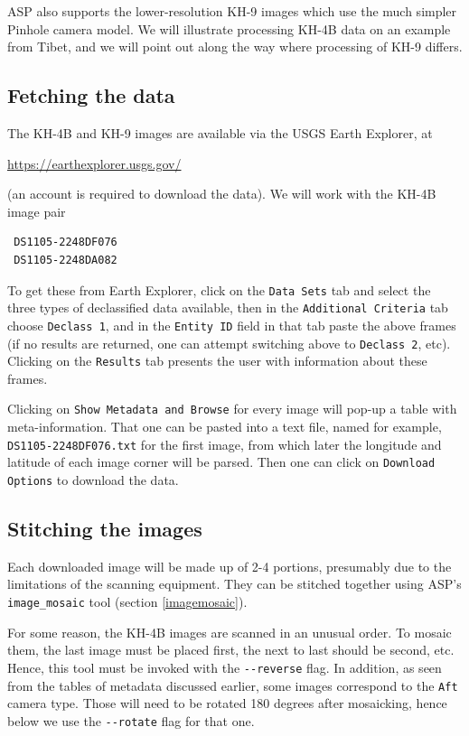 ASP also supports the lower-resolution KH-9 images which use the much
simpler Pinhole camera model. We will illustrate processing KH-4B data
on an example from Tibet, and we will point out along the way where
processing of KH-9 differs.

\subsection{Fetching the data}

The KH-4B and KH-9 images are available via the USGS Earth Explorer, at
\begin{center}
 \url{https://earthexplorer.usgs.gov/}
\end{center}

(an account is required to download the data). We will work with the
KH-4B image pair

\begin{verbatim}
 DS1105-2248DF076
 DS1105-2248DA082
\end{verbatim}

To get these from Earth Explorer, click on the \texttt{Data Sets}
tab and select the three types of declassified data available, then in the 
\texttt{Additional Criteria} tab choose \texttt{Declass 1}, and in
the \texttt{Entity ID} field in that tab paste the above frames (if no results
are returned, one can attempt switching above to \texttt{Declass 2},
etc). Clicking on the \texttt{Results} tab presents the user with information about
these frames.

Clicking on \texttt{Show Metadata and Browse} for every
image will pop-up a table with meta-information. That one can be pasted
into a text file, named for example, \texttt{DS1105-2248DF076.txt} for the
first image, from which later the longitude and latitude of each image corner
will be parsed. Then one can click on \texttt{Download Options} 
to download the data. 

\subsection{Stitching the images}

Each downloaded image will be made up of 2-4 portions, presumably due
to the limitations of the scanning equipment. They can be stitched together
using ASP's \texttt{image\_mosaic} tool (section \ref{imagemosaic}).

For some reason, the KH-4B images are scanned in an unusual order. To
mosaic them, the last image must be placed first, the next to last
should be second, etc. Hence, this tool must be invoked with the \texttt{-\/-reverse}
flag. In addition, as seen from the tables of metadata discussed
earlier, some images correspond to the \texttt{Aft} camera type. Those
will need to be rotated 180 degrees after mosaicking, hence below we use
the \texttt{-\/-rotate} flag for that one.

